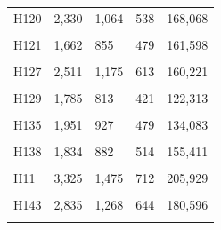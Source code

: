 \documentclass[
  a4paper,
  titlepage]{article}
\begin{document}
\begin{longtable}[t]{lllll}
H120 & 2,330 & 1,064 & 538 & 168,068\\
 
\cellcolor{gray!6}{H10} & \cellcolor{gray!6}{3,487} & \cellcolor{gray!6}{1,560} & \cellcolor{gray!6}{769} & \cellcolor{gray!6}{222,113}\\
 
H121 & 1,662 & 855 & 479 & 161,598\\
 
\cellcolor{gray!6}{H124} & \cellcolor{gray!6}{2,628} & \cellcolor{gray!6}{1,184} & \cellcolor{gray!6}{599} & \cellcolor{gray!6}{167,507}\\
 
H127 & 2,511 & 1,175 & 613 & 160,221\\
 
\cellcolor{gray!6}{H128} & \cellcolor{gray!6}{2,357} & \cellcolor{gray!6}{1,081} & \cellcolor{gray!6}{521} & \cellcolor{gray!6}{163,846}\\
 
H129 & 1,785 & 813 & 421 & 122,313\\
 
\cellcolor{gray!6}{H132} & \cellcolor{gray!6}{3,210} & \cellcolor{gray!6}{1,419} & \cellcolor{gray!6}{714} & \cellcolor{gray!6}{195,285}\\
 
H135 & 1,951 & 927 & 479 & 134,083\\
 
\cellcolor{gray!6}{H137} & \cellcolor{gray!6}{1,210} & \cellcolor{gray!6}{602} & \cellcolor{gray!6}{360} & \cellcolor{gray!6}{89,229}\\
 
H138 & 1,834 & 882 & 514 & 155,411\\
 
\cellcolor{gray!6}{H140} & \cellcolor{gray!6}{1,896} & \cellcolor{gray!6}{837} & \cellcolor{gray!6}{482} & \cellcolor{gray!6}{132,155}\\
 
H11 & 3,325 & 1,475 & 712 & 205,929\\
 
\cellcolor{gray!6}{H142} & \cellcolor{gray!6}{2,075} & \cellcolor{gray!6}{913} & \cellcolor{gray!6}{434} & \cellcolor{gray!6}{117,954}\\
 
H143 & 2,835 & 1,268 & 644 & 180,596\\
 
\cellcolor{gray!6}{H144} & \cellcolor{gray!6}{2,647} & \cellcolor{gray!6}{1,196} & \cellcolor{gray!6}{636} & \cellcolor{gray!6}{171,284}\\
 

\end{longtable}
\end{document}
